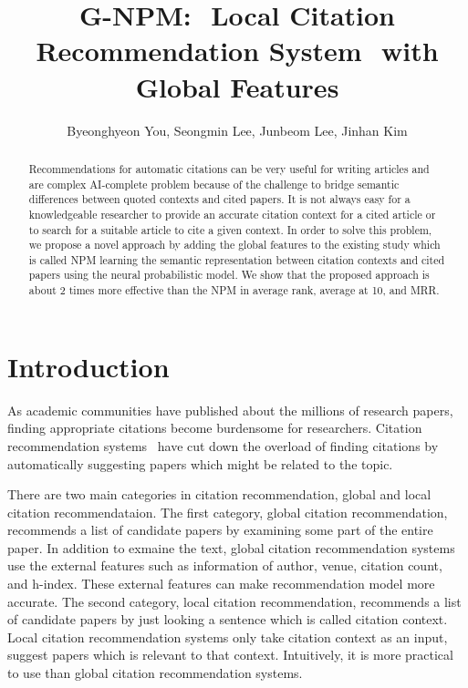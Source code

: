 \documentclass{llncs}
\begin{document}
\title{G-NPM:  Local Citation Recommendation System  with Global Features}

\author{Byeonghyeon You, Seongmin Lee, Junbeom Lee, Jinhan Kim}


\maketitle

\begin{abstract}
Recommendations for automatic citations can be very useful for writing articles and are complex AI-complete problem because of the challenge to bridge semantic differences between quoted contexts and cited papers. It is not always easy for a knowledgeable researcher to provide an accurate citation context for a cited article or to search for a suitable article to cite a given context. In order to solve this problem, we propose a novel approach by adding the global features to the existing study which is called NPM learning the semantic representation between citation contexts and cited papers using the neural probabilistic model. We show that the proposed approach is about 2 times more effective than the NPM in average rank, average at 10, and MRR.

\end{abstract}

\section{Introduction}
\label{sec:introduction}
As academic communities have published about the millions of research papers, finding appropriate citations become burdensome for researchers. Citation recommendation systems~\cite{ren2014cluscite,Huang:2015:NPM:2886521.2886655,Bethard:2010:ICL:1871437.1871517} have cut down the overload of finding citations by automatically suggesting papers which might be related to the topic.


There are two main categories in citation recommendation, global and local citation recommendataion.
The first category, global citation recommendation, recommends a list of candidate papers by examining some part of the entire paper. In addition to exmaine the text, global citation recommendation systems use the external features such as information of author, venue, citation count, and h-index. These external features can make recommendation model more accurate.
The second category, local citation recommendation, recommends a list of candidate papers by just looking a sentence which is called citation context. Local citation recommendation systems only take citation context as an input, suggest papers which is relevant to that context. Intuitively, it is more practical to use than global citation recommendation systems.
\end{document}
